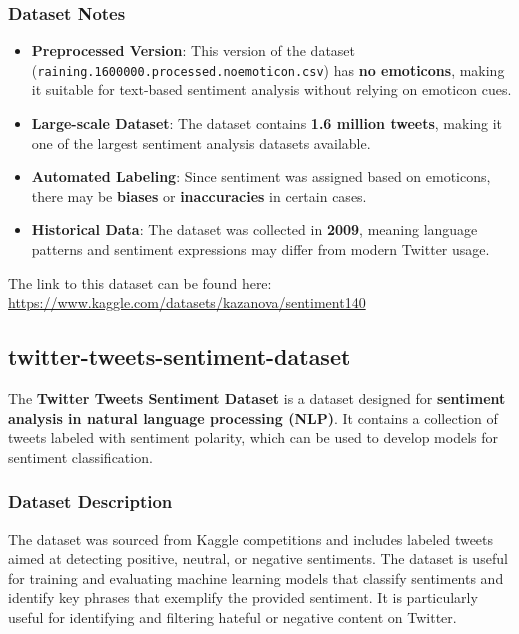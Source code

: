 \subsubsection{Dataset Notes}

\begin{itemize}
    \item \textbf{Preprocessed Version}: This version of the dataset (\texttt{raining.1600000.\allowbreak processed.\allowbreak noemoticon.csv}) has \textbf{no emoticons}, making it suitable for text-based sentiment analysis without relying on emoticon cues.
    \item \textbf{Large-scale Dataset}: The dataset contains \textbf{1.6 million tweets}, making it one of the largest sentiment analysis datasets available.
    \item \textbf{Automated Labeling}: Since sentiment was assigned based on emoticons, there may be \textbf{biases} or \textbf{inaccuracies} in certain cases.
    \item \textbf{Historical Data}: The dataset was collected in \textbf{2009}, meaning language patterns and sentiment expressions may differ from modern Twitter usage.
\end{itemize}

The link to this dataset can be found here: \url{https://www.kaggle.com/datasets/kazanova/sentiment140}

\subsection{twitter-tweets-sentiment-dataset}

The \textbf{Twitter Tweets Sentiment Dataset} is a dataset designed for \textbf{sentiment analysis in natural language processing (NLP)}. It contains a collection of tweets labeled with sentiment polarity, which can be used to develop models for sentiment classification.

\subsubsection{Dataset Description}

The dataset was sourced from Kaggle competitions and includes labeled tweets aimed at detecting positive, neutral, or negative sentiments. The dataset is useful for training and evaluating machine learning models that classify sentiments and identify key phrases that exemplify the provided sentiment. It is particularly useful for identifying and filtering hateful or negative content on Twitter.

